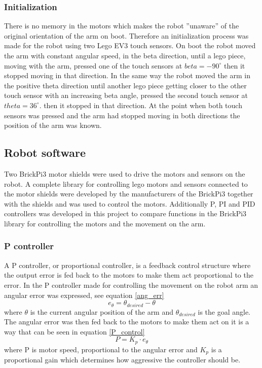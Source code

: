 \subsubsection{Initialization}
There is no memory in the motors which makes the robot ''unaware'' of the original orientation of the arm on boot. Therefore an initialization process was made for the robot using two Lego EV3 touch sensors. On boot the robot moved the arm with constant angular speed, in the beta direction, until a lego piece, moving with the arm, pressed one of the touch sensors at \(beta = -90^{\circ}\) then it stopped moving in that direction. In the same way the robot moved the arm in the positive theta direction until another lego piece getting closer to the other touch sensor with an increasing beta angle, pressed the second touch sensor at \(theta = 36^{\circ}\). then it stopped in that direction. At the point when both touch sensors was pressed and the arm had stopped moving in both directions the position of the arm was known.
\subsection{Robot software}
Two BrickPi3 motor shields were used to drive the motors and sensors on the robot. A complete library for controlling lego motors and sensors connected to the motor shields were developed by the manufacturers of the BrickPi3 together with the shields and was used to control the motors. Additionally P, PI and PID controllers was developed in this project to compare functions in the BrickPi3 library for controlling the motors and the movement on the arm.
\subsubsection{P controller}
A P controller, or proportional controller, is a feedback control structure where the output error is fed back to the motors to make them act proportional to the error. In the P controller made for controlling the movement on the robot arm an angular error was expressed, see equation \ref{ang_err}
\begin{equation}
    e_{\theta} = \theta_{desired} - \theta
    \label{ang_err}
\end{equation}
where \(\theta\) is the current angular position of the arm and \(\theta_{desired}\) is the goal angle. The angular error was then fed back to the motors to make them act on it is a way that can be seen in equation \ref{P_control}
\begin{equation}
    P = K_p\cdot e_{\theta}
    \label{P_control}
\end{equation}
where P is motor speed, proportional to the angular error and \(K_p\) is a proportional gain which determines how aggressive the controller should be.

